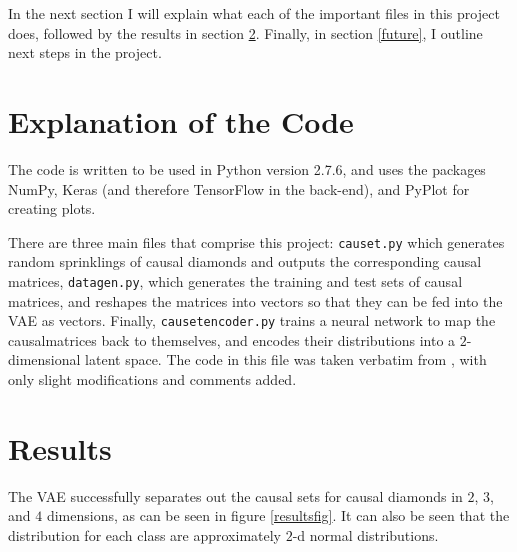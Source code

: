 \documentclass[letterpaper,10pt]{article}
\def\code#1{\texttt{#1}}
\begin{document}
In the next section I will explain what each of the important files in this project does, followed by the results in section \ref{results}.  Finally, 
in section \ref{future}, I outline next steps in the project.

\section{Explanation of the Code}

The code is written to be used in Python version 2.7.6, and uses the packages NumPy, Keras (and therefore TensorFlow in the back-end), and PyPlot for 
creating plots.

There are three main files that comprise this project: \code{causet.py} which generates random sprinklings of causal diamonds and outputs 
the corresponding causal matrices, \code{datagen.py}, which generates the training and test sets of causal matrices, and reshapes the matrices into vectors so that 
they can be fed into the VAE as vectors.  Finally, \code{causetencoder.py} trains a neural network to map the causalmatrices back to themselves, and 
encodes their distributions into a $2$-dimensional latent space.  The code in this file was taken verbatim from 
\cite{kerasauto}, with only slight modifications and comments added.


\section{Results} \label{results}

The VAE successfully separates out the causal sets for causal diamonds in $2$, $3$, and $4$ dimensions, as can be seen in figure \ref{resultsfig}.  
It can also be seen that the distribution for each class are approximately $2$-d normal distributions.
\end{document}
